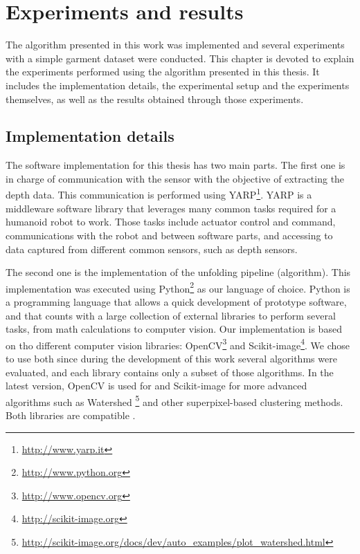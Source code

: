 \chapter{Experiments and results}
\label{experiments_and_results}

The algorithm presented in this work was implemented and several experiments with a simple garment dataset were conducted. This chapter is devoted to explain the experiments performed using the algorithm presented in this thesis. It includes the implementation details, the experimental setup and the experiments themselves, as well as the results obtained through those experiments.

\section{Implementation details}
\label{experiments:implementation}
The software implementation for this thesis has two main parts. The first one is in charge of communication with the sensor with the objective of extracting the depth data. This communication is performed using YARP\footnote{\url{http://www.yarp.it}}. YARP is a middleware software library  that leverages many common tasks required for a humanoid robot to work. Those tasks include actuator control and command, communications with the robot and between software parts, and accessing to data captured from different common sensors, such as depth sensors.

The second one is the implementation of the unfolding pipeline (algorithm). This implementation was executed using Python\footnote{\url{http://www.python.org}} as our language of choice. Python is a programming language that allows a quick development of prototype software, and that counts with a large collection of external libraries  to perform several tasks, from math calculations to computer vision. Our implementation is based on tho different computer vision libraries: OpenCV\footnote{\url{http://www.opencv.org}} and Scikit-image\footnote{\url{http://scikit-image.org}}. We chose to use both since during the development of this work several algorithms were evaluated, and each library contains only a subset of those algorithms. In the latest version, OpenCV is used for  and Scikit-image for more advanced algorithms such as Watershed \footnote{\url{http://scikit-image.org/docs/dev/auto_examples/plot_watershed.html}} and other superpixel-based clustering methods. Both libraries are compatible .

